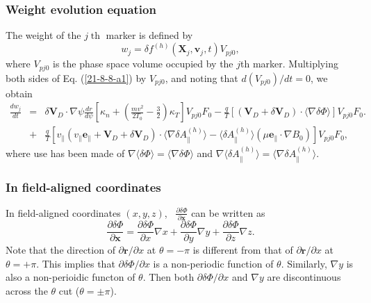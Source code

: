 \documentclass{llncs}
\newcommand{\tmop}[1]{\ensuremath{\operatorname{#1}}}
\begin{document}
\subsubsection{Weight evolution equation}

The weight of the $j \tmop{th}$ marker is defined by
\begin{equation}
  w_j = \delta f^{(h)}  (\mathbf{X}_j, \mathbf{v}_j, t) V_{p j 0},
\end{equation}
where $V_{p j 0}$ is the phase space volume occupied by the $j$th marker.
Multiplying both sides of Eq. (\ref{21-8-8-a1}) by $V_{p j 0}$, and noting
that $d (V_{p j 0}) / d t = 0$, we obtain
\begin{eqnarray}
  \frac{d w_j}{d t} & = & \delta \mathbf{V}_D \cdot \nabla \psi \frac{d r}{d
  \psi} \left[ \kappa_n + \left( \frac{m v^2}{2 T_0} - \frac{3}{2} \right)
  \kappa_T \right] V_{p j 0} F_0 - \frac{q}{T} [(\mathbf{V}_D + \delta
  \mathbf{V}_D) \cdot \langle \nabla \delta \Phi \rangle] V_{p j 0} F_0 .
  \nonumber\\
  & + & \frac{q}{T} [v_{\parallel} (v_{\parallel} \mathbf{e}_{\parallel}
  +\mathbf{V}_D + \delta \mathbf{V}_D) \cdot \langle \nabla \delta
  A_{\parallel}^{(h)} \rangle - \langle \delta A_{\parallel}^{(h)} \rangle
  (\mu \mathbf{e}_{\parallel} \cdot \nabla B_0)] V_{p j 0} F_0, 
  \label{17-7-25-1m}
\end{eqnarray}
where use has been made of $\nabla \langle \delta \Phi \rangle = \langle
\nabla \delta \Phi \rangle$ and $\nabla \langle \delta A_{\parallel}^{(h)}
\rangle = \langle \nabla \delta A_{\parallel}^{(h)} \rangle$.

\subsubsection{In field-aligned coordinates}

In field-aligned coordinates $(x, y, z)$, \ $\frac{\partial \delta
\Phi}{\partial \mathbf{x}}$ can be written as
\begin{equation}
  \label{23-11-29-p1} \frac{\partial \delta \Phi}{\partial \mathbf{x}} =
  \frac{\partial \delta \Phi}{\partial x} \nabla x + \frac{\partial \delta
  \Phi}{\partial y} \nabla y + \frac{\partial \delta \Phi}{\partial z} \nabla
  z.
\end{equation}
Note that the direction of $\partial \mathbf{r}/ \partial x$ at $\theta = -
\pi$ is different from that of $\partial \mathbf{r}/ \partial x$ at $\theta =
+ \pi$. This implies that $\partial \delta \Phi / \partial x$ is a
non-periodic function of $\theta$. Similarly, $\nabla y$ is also a
non-perioidic functon of $\theta$. Then both $\partial \delta \Phi / \partial
x$ and $\nabla y$ are discontinuous across the $\theta$ cut ($\theta = \pm
\pi$).
\end{document}

